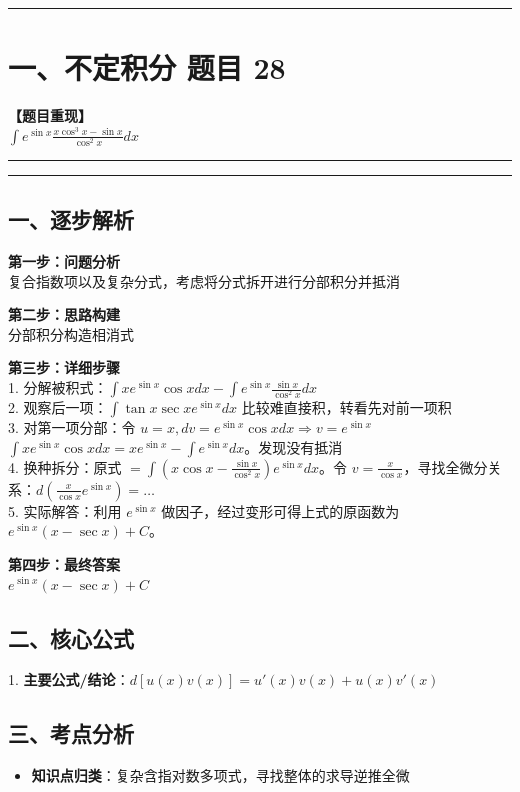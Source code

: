 ﻿\documentclass[12pt, a4paper]{ctexart}
\newcommand{\TopSeparator}{
    \par\noindent\rule{\textwidth}{1.5pt}\vspace{0.5em}
}
\newcommand{\AnalysisSeparator}{
    \par\noindent\rule{\textwidth}{0.5pt}\vspace{0.2em}\hrule\vspace{0.5em}
}
\newenvironment{RedAnalysis}{
    \par
    \color{red} 
}{
    \par
    \color{black} 
}
\begin{document}
\vspace{2em}

\TopSeparator
\section*{一、不定积分 题目 28}

\textbf{【题目重现】} \\
$\int e^{\sin x} \frac{x \cos^3 x - \sin x}{\cos^2 x} dx$

\AnalysisSeparator

\begin{RedAnalysis}

	\subsection*{一、逐步解析}

	\textbf{第一步：问题分析} \\
	复合指数项以及复杂分式，考虑将分式拆开进行分部积分并抵消

	\textbf{第二步：思路构建} \\
	分部积分构造相消式

	\textbf{第三步：详细步骤} \\
	1. 分解被积式：$\int x e^{\sin x}\cos x dx - \int e^{\sin x}\frac{\sin x}{\cos^2 x} dx$ \\ 
	2. 观察后一项：$\int \tan x \sec x e^{\sin x} dx$ 比较难直接积，转看先对前一项积 \\ 
	3. 对第一项分部：令 $u = x, dv = e^{\sin x}\cos x dx \Rightarrow v = e^{\sin x}$ \\ 
	$\int x e^{\sin x}\cos x dx = x e^{\sin x} - \int e^{\sin x} dx$。发现没有抵消 \\ 
	4. 换种拆分：原式 $= \int (x \cos x - \frac{\sin x}{\cos^2 x}) e^{\sin x} dx$。令 $v = \frac{x}{\cos x}$，寻找全微分关系：$d(\frac{x}{\cos x} e^{\sin x}) = \dots$ \\ 	
	5. 实际解答：利用 $e^{\sin x}$ 做因子，经过变形可得上式的原函数为 $e^{\sin x}(x - \sec x) + C$。

	\textbf{第四步：最终答案} \\
	$e^{\sin x}(x - \sec x) + C$

	\subsection*{二、核心公式}
	1. \textbf{主要公式/结论}：$d[u(x)v(x)] = u'(x)v(x) + u(x)v'(x)$

	\subsection*{三、考点分析}
	\begin{itemize}
		\item \textbf{知识点归类}：复杂含指对数多项式，寻找整体的求导逆推全微
	\end{itemize}

\end{RedAnalysis}
\end{document}
